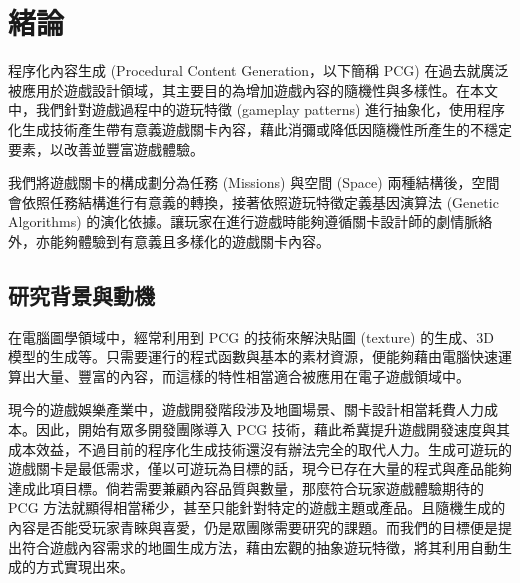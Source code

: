 \chapter{緒論}
\label{cha:intro}

程序化內容生成 (Procedural Content Generation，以下簡稱 PCG) 在過去就廣泛被應用於遊戲設計領域，其主要目的為增加遊戲內容的隨機性與多樣性。在本文中，我們針對遊戲過程中的遊玩特徵 (gameplay patterns) 進行抽象化，使用程序化生成技術產生帶有意義遊戲關卡內容，藉此消彌或降低因隨機性所產生的不穩定要素，以改善並豐富遊戲體驗。

我們將遊戲關卡的構成劃分為任務 (Missions) 與空間 (Space) 兩種結構後，空間會依照任務結構進行有意義的轉換，接著依照遊玩特徵定義基因演算法 (Genetic Algorithms) 的演化依據。讓玩家在進行遊戲時能夠遵循關卡設計師的劇情脈絡外，亦能夠體驗到有意義且多樣化的遊戲關卡內容。

\section{研究背景與動機}

在電腦圖學領域中，經常利用到 PCG 的技術來解決貼圖 (texture) 的生成、3D 模型的生成等。只需要運行的程式函數與基本的素材資源，便能夠藉由電腦快速運算出大量、豐富的內容，而這樣的特性相當適合被應用在電子遊戲領域中。

現今的遊戲娛樂產業中，遊戲開發階段涉及地圖場景、關卡設計相當耗費人力成本。因此，開始有眾多開發團隊導入 PCG 技術，藉此希冀提升遊戲開發速度與其成本效益，不過目前的程序化生成技術還沒有辦法完全的取代人力。生成可遊玩的遊戲關卡是最低需求，僅以可遊玩為目標的話，現今已存在大量的程式與產品能夠達成此項目標。倘若需要兼顧內容品質與數量，那麼符合玩家遊戲體驗期待的 PCG 方法就顯得相當稀少，甚至只能針對特定的遊戲主題或產品。且隨機生成的內容是否能受玩家青睞與喜愛，仍是眾團隊需要研究的課題。而我們的目標便是提出符合遊戲內容需求的地圖生成方法，藉由宏觀的抽象遊玩特徵，將其利用自動生成的方式實現出來。





